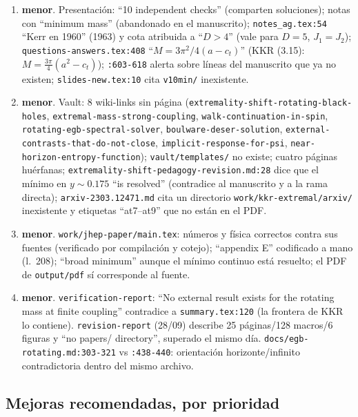 \documentclass[10pt,a4paper]{article}
\newcommand{\MEN}{\textbf{menor}}
\newcommand{\code}[1]{\texttt{#1}}
\begin{document}
\begin{enumerate}[label=D\arabic*.,leftmargin=2.4em]
\item \MEN. Presentación: ``10 independent checks'' (comparten soluciones); notas con ``minimum mass''
 (abandonado en el manuscrito); \code{notes\_ag.tex:54} ``Kerr en 1960'' (1963) y cota atribuida a
 ``$D>4$'' (vale para $D=5$, $J_1=J_2$); \code{questions-answers.tex:408} ``$M=3\pi^2/4(a-c_t)$''
 (KKR (3.15): $M=\tfrac{3\pi}4(a^2-c_t)$); \code{:603-618} alerta sobre líneas del manuscrito que ya
 no existen; \code{slides-new.tex:10} cita \code{v10min/} inexistente.
\item \MEN. Vault: 8 wiki-links sin página (\code{extremality-shift-rotating-black-holes},
 \code{extremal-mass-strong-coupling}, \code{walk-continuation-in-spin},
 \code{rotating-egb-spectral-solver}, \code{boulware-deser-solution},
 \code{external-contrasts-that-do-not-close}, \code{implicit-response-for-psi},
 \code{near-horizon-entropy-function}); \code{vault/templates/} no existe; cuatro páginas huérfanas;
 \code{extremality-shift-pedagogy-revision.md:28} dice que el mínimo en $y\sim0.175$ ``is resolved''
 (contradice al manuscrito y a la rama directa); \code{arxiv-2303.12471.md} cita un directorio
 \code{work/kkr-extremal/arxiv/} inexistente y etiquetas ``at7--at9'' que no están en el PDF.
\item \MEN. \code{work/jhep-paper/main.tex}: números y física correctos contra sus fuentes (verificado
 por compilación y cotejo); ``appendix E'' codificado a mano (l.~208); ``broad minimum'' aunque el
 mínimo continuo está resuelto; el PDF de \code{output/pdf} sí corresponde al fuente.
\item \MEN. \code{verification-report}: ``No external result exists for the rotating mass at finite
 coupling'' contradice a \code{summary.tex:120} (la frontera de KKR lo contiene).
 \code{revision-report} (28/09) describe 25 páginas/128 macros/6 figuras y ``no papers/ directory'',
 superado el mismo día. \code{docs/egb-rotating.md:303-321} vs \code{:438-440}: orientación
 horizonte/infinito contradictoria dentro del mismo archivo.
\end{enumerate}

\subsection{Mejoras recomendadas, por prioridad}
\end{document}
